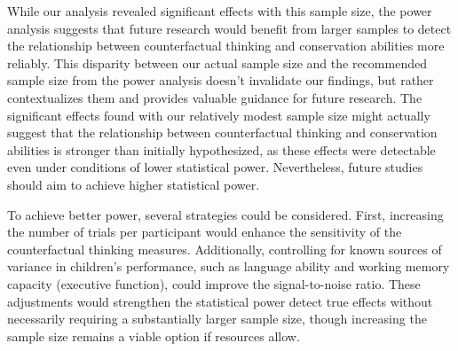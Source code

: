 \documentclass[
  doc]{apa6}
\newenvironment{Shaded}{\begin{snugshade}}{\end{snugshade}}
\newcommand{\CommentTok}[1]{\textcolor[rgb]{0.56,0.35,0.01}{\textit{#1}}}
\newcommand{\FloatTok}[1]{\textcolor[rgb]{0.00,0.00,0.81}{#1}}
\newcommand{\FunctionTok}[1]{\textcolor[rgb]{0.13,0.29,0.53}{\textbf{#1}}}
\newcommand{\NormalTok}[1]{#1}
\newcommand{\OtherTok}[1]{\textcolor[rgb]{0.56,0.35,0.01}{#1}}
\newcommand{\SpecialCharTok}[1]{\textcolor[rgb]{0.81,0.36,0.00}{\textbf{#1}}}
\newcommand{\StringTok}[1]{\textcolor[rgb]{0.31,0.60,0.02}{#1}}
\begin{document}
\begin{Shaded}
\end{Shaded}

While our analysis revealed significant effects with this sample size, the power analysis suggests that future research would benefit from larger samples to detect the relationship between counterfactual thinking and conservation abilities more reliably. This disparity between our actual sample size and the recommended sample size from the power analysis doesn't invalidate our findings, but rather contextualizes them and provides valuable guidance for future research. The significant effects found with our relatively modest sample size might actually suggest that the relationship between counterfactual thinking and conservation abilities is stronger than initially hypothesized, as these effects were detectable even under conditions of lower statistical power. Nevertheless, future studies should aim to achieve higher statistical power.

To achieve better power, several strategies could be considered. First, increasing the number of trials per participant would enhance the sensitivity of the counterfactual thinking measures. Additionally, controlling for known sources of variance in children's performance, such as language ability and working memory capacity (executive function), could improve the signal-to-noise ratio. These adjustments would strengthen the statistical power detect true effects without necessarily requiring a substantially larger sample size, though increasing the sample size remains a viable option if resources allow.
\end{document}
